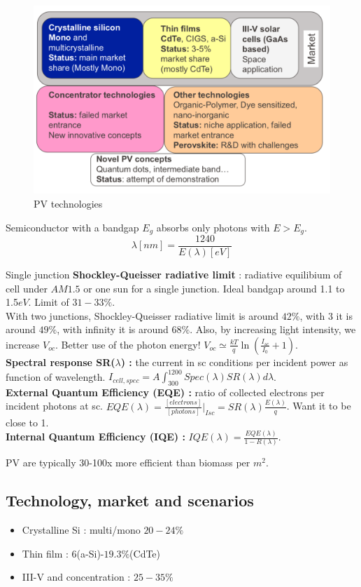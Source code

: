 \documentclass[../main.tex]{subfiles}
\begin{document}
\begin{figure}[hbt!]
    \centering
    \includegraphics[width=0.6\linewidth]{IMAGES/PV/Screenshot 2025-02-18 at 14.56.30.jpeg.png}
    \caption{PV technologies}
\end{figure}

Semiconductor with a bandgap $E_g$ absorbs only photons with $E>E_g$. \begin{equation}
    \lambda [nm] = \frac{1240}{E(\lambda)[eV]}
\end{equation}

Single junction \textbf{Shockley-Queisser radiative limit} : radiative equilibium of cell under $AM1.5$ or one sun for a single junction. Ideal bandgap around 1.1 to 1.5$eV$. Limit of $31-33\%$.\\

With two junctions, Shockley-Queisser radiative limit is around $42\%$, with 3 it is around $49\%$, with infinity it is around $68\%$. Also, by increasing light intensity, we increase $V_{oc}$. Better use of the photon energy! $V_{oc} \simeq \frac{kT}{q} \ln (\frac{I_{sc}}{I_0}+1)$.\\

\textbf{Spectral response SR($\lambda$) :} the current in sc conditions per incident power as function of wavelength. $I_{cell, spec}= A \int_{300}^{1200}Spec(\lambda) SR(\lambda)d\lambda$.\\
\textbf{External Quantum Efficiency (EQE) : } ratio of collected electrons per incident photons at sc. $EQE(\lambda) = \frac{[electrons]}{[photons]}\rvert_{Isc} = SR(\lambda) \frac{E(\lambda)}{q}$. Want it to be close to 1.\\
\textbf{Internal Quantum Efficiency (IQE) : } $IQE(\lambda) = \frac{EQE(\lambda)}{1-R(\lambda)}$.

\warning PV are typically 30-100x more efficient than biomass per $m^2$.\\

\subsection{Technology, market and scenarios}
\begin{itemize}
    \item Crystalline Si : multi/mono $20-24\%$
    \item Thin film : $6$(a-Si)-$19.3\%$(CdTe)
    \item III-V and concentration : $25-35\%$
\end{itemize}
\end{document}
